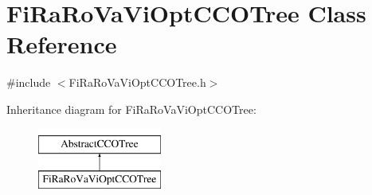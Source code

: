 \hypertarget{class_fi_ra_ro_va_vi_opt_c_c_o_tree}{}\section{Fi\+Ra\+Ro\+Va\+Vi\+Opt\+C\+C\+O\+Tree Class Reference}
\label{class_fi_ra_ro_va_vi_opt_c_c_o_tree}


{\ttfamily \#include $<$Fi\+Ra\+Ro\+Va\+Vi\+Opt\+C\+C\+O\+Tree.\+h$>$}

Inheritance diagram for Fi\+Ra\+Ro\+Va\+Vi\+Opt\+C\+C\+O\+Tree\+:\begin{figure}[H]
\begin{center}
\leavevmode
\includegraphics[height=2.000000cm]{d2/d1c/class_fi_ra_ro_va_vi_opt_c_c_o_tree}
\end{center}
\end{figure}
